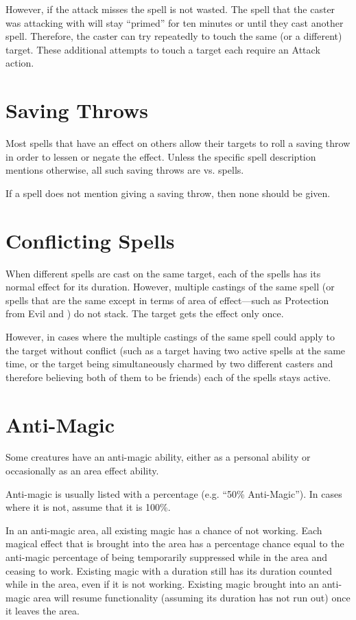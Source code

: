 \begin{multicols*}{2}
However, if the attack misses the spell is not wasted. The spell that the caster was attacking with will stay “primed” for ten minutes or until they cast another spell. Therefore, the caster can try repeatedly to touch the same (or a different) target. These additional attempts to touch a target each require an Attack action.

\section{Saving Throws}
Most spells that have an effect on others allow their targets to roll a saving throw in order to lessen or negate the effect. Unless the specific spell description mentions otherwise, all such saving throws are vs. spells.

If a spell does not mention giving a saving throw, then none should be given.

\section{Conflicting Spells}
When different spells are cast on the same target, each of the spells has its normal effect for its duration. However, multiple castings of the same spell (or spells that are the same except in terms of area of effect—such as Protection from Evil and ) do not stack. The target gets the effect only once.

However, in cases where the multiple castings of the same spell could apply to the target without conflict (such as a target having two active  spells at the same time, or the target being simultaneously charmed by two different casters and therefore believing both of them to be friends) each of the spells stays active.

\section{Anti-Magic}\label{sec:Anti-Magic}
Some creatures have an anti-magic ability, either as a personal ability or occasionally as an area effect ability.

Anti-magic is usually listed with a percentage (e.g. “50\% Anti-Magic”). In cases where it is not, assume that it is 100\%.

In an anti-magic area, all existing magic has a chance of not working. Each magical effect that is brought into the area has a percentage chance equal to the anti-magic percentage of being temporarily suppressed while in the area and ceasing to work. Existing magic with a duration still has its duration counted while in the area, even if it is not working. Existing magic brought into an anti-magic area will resume functionality (assuming its duration has not run out) once it leaves the area.


\end{multicols*}

